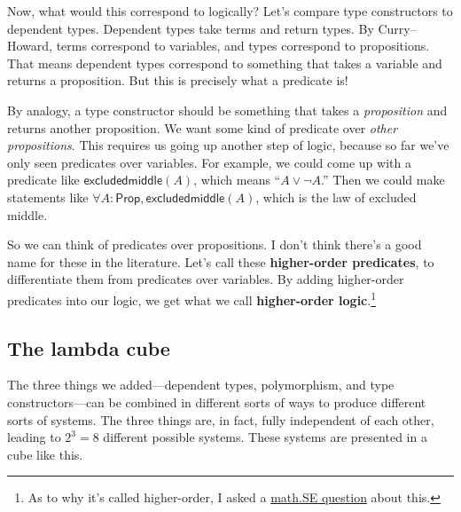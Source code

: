 \documentclass[11pt,paper=letter]{scrartcl}
\newcommand{\sf}{\mathsf}
\renewcommand{\lor}{\vee}
\renewcommand{\lnot}{\neg}
\newcommand{\prop}{\mathsf{Prop}}
\begin{document}
Now, what would this correspond to logically? Let's compare type constructors to dependent types. Dependent types take terms and return types. By Curry--Howard, terms correspond to variables, and types correspond to propositions. That means dependent types correspond to something that takes a variable and returns a proposition. But this is precisely what a predicate is!

By analogy, a type constructor should be something that takes a \emph{proposition} and returns another proposition. We want some kind of predicate over \emph{other propositions}. This requires us going up another step of logic, because so far we've only seen predicates over variables. For example, we could come up with a predicate like $\sf{excludedmiddle}(A)$, which means ``$A \lor \lnot A$.'' Then we could make statements like $\forall A: \prop, \sf{excludedmiddle}(A)$, which is the law of excluded middle.

So we can think of predicates over propositions. I don't think there's a good name for these in the literature. Let's call these \textbf{higher-order predicates}, to differentiate them from predicates over variables. By adding higher-order predicates into our logic, we get what we call \textbf{higher-order logic}.\footnote{As to why it's called higher-order, I asked a \href{https://math.stackexchange.com/questions/4232108}{math.SE question} about this.} 

\subsection{The lambda cube}

The three things we added---dependent types, polymorphism, and type constructors---can be combined in different sorts of ways to produce different sorts of systems. The three things are, in fact, fully independent of each other, leading to $2^3 = 8$ different possible systems. These systems are presented in a cube like this.

\begin{center}
\end{center}
\end{document}
